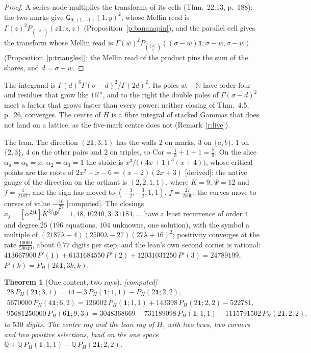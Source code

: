 \documentclass[11pt]{article}
\newcommand{\one}{\mathbf 1}
\newcommand{\sG}{\mathsf G}
\theoremstyle{plain}
\newtheorem{theorem}[proposition]{Theorem}
\theoremstyle{definition}
\theoremstyle{remark}
\newcommand{\derived}{\textup{[derived]}}
\newcommand{\computed}{\textup{[computed]}}
\begin{document}
\begin{proof}
A series node multiplies the transforms of its cells (Thm.~22.13, p.~188): the two marks give $\sG_{0;(1,-1)}(1,y)^2$, whose Mellin read is $\Gamma(z)^2P_{\binom{[2]}1}(z\one;z,z)$ (Proposition~\ref{p:bananapin}), and the parallel cell gives the transform whose Mellin read is $\Gamma(w)^2P_{\binom{[2]}1}((\sigma-w)\one;\sigma-w,\sigma-w)$ (Proposition~\ref{p:triangles}); the Mellin read of the product pins the sum of the shares, and $d=\sigma-w$.
\end{proof}

The integrand is $\Gamma(d)^6\Gamma(\sigma-d)^2/\Gamma(2d)^2$. Its poles at $-\mathbb N$ have order four and residues that grow like $16^m$, and to the right the double poles of $\Gamma(\sigma-d)^2$ meet a factor that grows faster than every power: neither closing of Thm.~4.5, p.~26, converges. The centre of $H$ is a fibre integral of stacked Gammas that does not land on a lattice, as the five-mark centre does not (Remark~\ref{r:live}).

\noindent The lean. The direction $(2\one;3,1)$ has the walls $2$ on marks, $3$ on $\{a,b\}$, $1$ on $\{2,3\}$, $4$ on the other pairs and $2$ on triples, so $\mathrm{Cor}=\frac13+1+1=\frac73$. On the slice $\alpha_a=\alpha_b=x$, $\alpha_2=\alpha_3=1$ the stride is $x^3/\big((4x+1)^3(x+4)\big)$, whose critical points are the roots of $2x^2-x-6=(x-2)(2x+3)$ \derived: the native gauge of the direction on the orthant is $(2,2,1,1)$, where $K=9$, $\Psi=12$ and $f=\frac4{2187}$, and the sign has moved to $(-\frac32,-\frac32,1,1)$, $f=\frac{27}{2500}$; the curves move to curves of value $-\frac{16}{27}$ \computed. The closings $x_j=[\alpha^{2j\one}]K^{3j}\Psi^j=1,48,10240,3131184,\dots$ have a least recurrence of order $4$ and degree $25$ ($196$ equations, $104$ unknowns, one solution), with the symbol a multiple of $(2187\lambda-4)(2500\lambda-27)(27\lambda+16)^2$; positivity converges at the rate $\frac{10000}{59049}$, about $0.77$ digits per step, and the lean's own second corner is rational: $413667900\,P'(1)+6131684550\,P'(2)+12031031250\,P'(3)=24789199$, $P'(k)=P_H(2k\one;3k,k)$.

\begin{theorem}[One content, two rays]\label{t:Hcontent}\computed\
\begin{gather*}
28\,P_H(2\one;3,1)=14-3\,P_H(\one;1,1)-P_H(2\one;2,2),\\
5670000\,P_H(4\one;6,2)=126002\,P_H(\one;1,1)+143398\,P_H(2\one;2,2)-522781,\\
95681250000\,P_H(6\one;9,3)=3048368669-731189098\,P_H(\one;1,1)-1115791502\,P_H(2\one;2,2),
\end{gather*}
to $530$ digits. The centre ray and the lean ray of $H$, with two laws, two corners and two positive selections, land on the one space $\mathbb Q+\mathbb Q\,P_H(\one;1,1)+\mathbb Q\,P_H(2\one;2,2)$.
\end{theorem}
\end{document}
